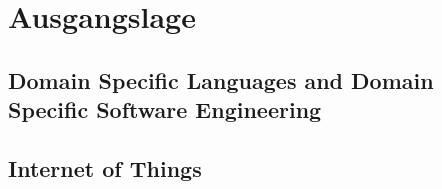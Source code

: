 
\chapter{Ausgangslage}

\section{Domain Specific Languages and Domain Specific Software Engineering}


\section{Internet of Things}

